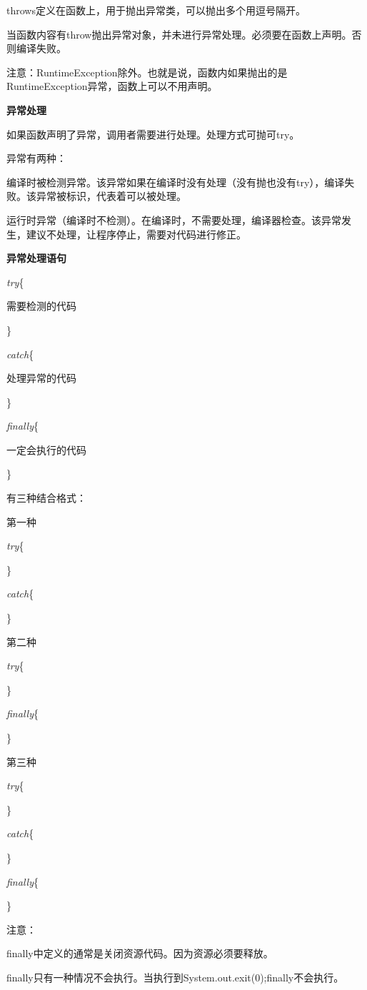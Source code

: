 \documentclass[UTF8]{ctexart}
\begin{document}
\textbullet throws定义在函数上，用于抛出异常类，可以抛出多个用逗号隔开。

当函数内容有throw抛出异常对象，并未进行异常处理。必须要在函数上声明。否则编译失败。

注意：RuntimeException除外。也就是说，函数内如果抛出的是RuntimeException异常，函数上可以不用声明。

\textbf{异常处理}

如果函数声明了异常，调用者需要进行处理。处理方式可抛可try。

异常有两种：

\textbullet 编译时被检测异常。该异常如果在编译时没有处理（没有抛也没有try），编译失败。该异常被标识，代表着可以被处理。

\textbullet 运行时异常（编译时不检测）。在编译时，不需要处理，编译器检查。该异常发生，建议不处理，让程序停止，需要对代码进行修正。

\textbf{异常处理语句}

\textit{try}\{

\qquad 需要检测的代码

\}

\textit{catch}\{

\qquad 处理异常的代码

\}

\textit{finally}\{

一定会执行的代码

\}

有三种结合格式：

\textbullet 第一种

\textit{try}\{

\}

\textit{catch}\{

\}

\textbullet 第二种

\textit{try}\{

\}

\textit{finally}\{

\}

\textbullet 第三种

\textit{try}\{

\}

\textit{catch}\{

\}

\textit{finally}\{

\}

注意：

\textbullet finally中定义的通常是关闭资源代码。因为资源必须要释放。

\textbullet finally只有一种情况不会执行。当执行到System.out.exit(0);finally不会执行。
\end{document}
